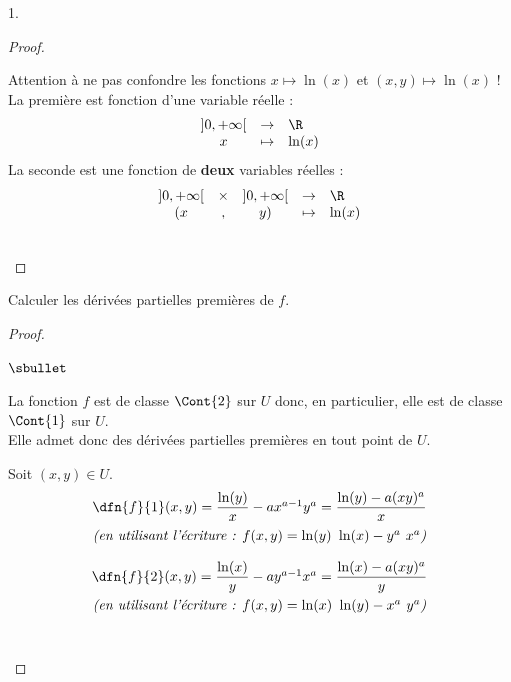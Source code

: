 \documentclass[11pt]{article}%
\begin{document}
\begin{noliste}{1.}
\begin{proof}
    \begin{remark}
      Attention à ne pas confondre les fonctions $x\mapsto \ln(x)$ et 
      $(x,y)\mapsto \ln(x)$ !\\
      La première est fonction d'une variable réelle : 
      \[
      \begin{array}{ccl}
        ]0,+\infty[ & \to & \R\\
        x & \mapsto & \ln(x)
      \end{array}
      \]
      La seconde est une fonction de {\bf deux} variables réelles :
      \[
      \begin{array}{ccccl}
        ]0,+\infty[ & \times &  ]0,+\infty[ & \to & \R\\
        (x &  , &  y) & \mapsto & \ln(x)
      \end{array}
      \]
    \end{remark}~\\[-1.4cm]
  \end{proof}
  
\item Calculer les dérivées partielles premières de $f$.
  
  \begin{proof}~
    \begin{noliste}{$\sbullet$}
    \item La fonction $f$ est de classe $\Cont{2}$ sur $U$ donc, en
      particulier, elle est de classe $\Cont{1}$ sur $U$.\\
      Elle admet donc des dérivées partielles premières en tout point
      de $U$.
    \item Soit $(x,y)\in U$.
      \[
      \begin{array}{c}
        \dfn{f}{1}(x,y) = 
        \dfrac{\ln(y)}{x}-ax^{a-1}y^a=\dfrac{\ln(y)-a(xy)^a}{x}
        \\[.3cm]
        \text{\it (en utilisant l'écriture : $f(x, y) = \ln(y) \ \ln(x) -
          y^a \ x^a$)} 
        \\[.4cm]
        \dfn{f}{2}(x,y) = 
        \dfrac{\ln(x)}{y}-ay^{a-1}x^a=\dfrac{\ln(x)-a(xy)^a}{y}
        \\[.3cm]
        \text{\it (en utilisant l'écriture : $f(x, y) = \ln(x) \ \ln(y) -
          x^a \ y^a$)} 
      \end{array}
      \]
      ~\\[-1.2cm]
    \end{noliste}
  \end{proof}
  

\end{noliste}
\end{document}
